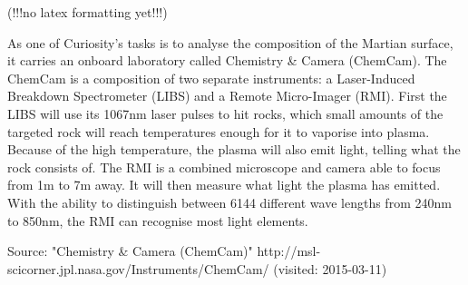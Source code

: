 (!!!no latex formatting yet!!!)

As one of Curiosity's tasks is to analyse the composition of the Martian surface, it carries an onboard laboratory called Chemistry & Camera (ChemCam).
 The ChemCam is a composition of two separate instruments: a Laser-Induced Breakdown Spectrometer (LIBS) and a Remote Micro-Imager (RMI).
 First the LIBS will use its 1067nm laser pulses to hit rocks, which small amounts of the targeted rock will reach temperatures enough for it to vaporise into plasma.
 Because of the high temperature, the plasma will also emit light, telling what the rock consists of.
 The RMI is a combined microscope and camera able to focus from 1m to 7m away.
 It will then measure what light the plasma has emitted.
 With the ability to distinguish between 6144 different wave lengths from 240nm to 850nm, the RMI can recognise most light elements.

Source:
"Chemistry & Camera (ChemCam)"
http://msl-scicorner.jpl.nasa.gov/Instruments/ChemCam/ (visited: 2015-03-11)